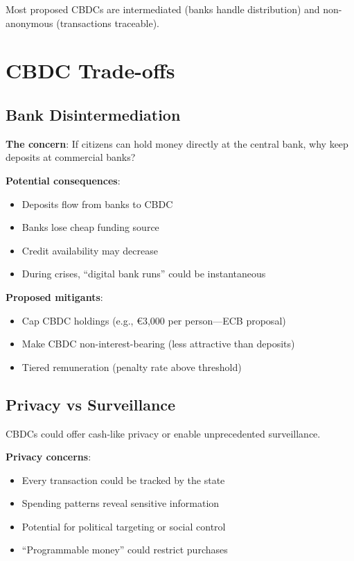 \documentclass[11pt,a4paper]{article}
\begin{document}
Most proposed CBDCs are intermediated (banks handle distribution) and non-anonymous (transactions traceable).

\section{CBDC Trade-offs}

\subsection{Bank Disintermediation}

\textbf{The concern}: If citizens can hold money directly at the central bank, why keep deposits at commercial banks?

\textbf{Potential consequences}:
\begin{itemize}
    \item Deposits flow from banks to CBDC
    \item Banks lose cheap funding source
    \item Credit availability may decrease
    \item During crises, ``digital bank runs'' could be instantaneous
\end{itemize}

\textbf{Proposed mitigants}:
\begin{itemize}
    \item Cap CBDC holdings (e.g., €3,000 per person---ECB proposal)
    \item Make CBDC non-interest-bearing (less attractive than deposits)
    \item Tiered remuneration (penalty rate above threshold)
\end{itemize}

\subsection{Privacy vs Surveillance}

CBDCs could offer cash-like privacy or enable unprecedented surveillance.

\textbf{Privacy concerns}:
\begin{itemize}
    \item Every transaction could be tracked by the state
    \item Spending patterns reveal sensitive information
    \item Potential for political targeting or social control
    \item ``Programmable money'' could restrict purchases
\end{itemize}
\end{document}
